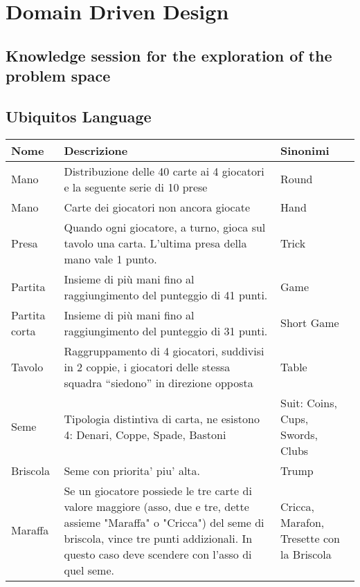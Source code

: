 \chapter{Domain Driven Design}
\label{ch:ddd} %

\section{Knowledge session for the exploration of the problem space}
\newpage
\section{Ubiquitos Language}
\begin{table}[!ht]
    \centering
    \begin{adjustbox}{max width=1.1\textwidth,center}
    \begin{tabular}{|l|p{10cm}|l|}
    \hline
        Nome & Descrizione & Sinonimi \\ \hline
        Mano & Distribuzione delle 40 carte ai 4 giocatori e la seguente serie di 10 prese & Round \\ \hline
        Mano & Carte dei giocatori non ancora giocate & Hand \\ \hline
        Presa & Quando ogni giocatore, a turno, gioca sul tavolo una carta. L’ultima presa della mano vale 1 punto. & Trick \\ \hline
        Partita & Insieme di più mani fino al raggiungimento del punteggio di 41 punti. & Game \\ \hline
        Partita corta & Insieme di più mani fino al raggiungimento del punteggio di 31 punti. & Short Game \\ \hline
        Tavolo & Raggruppamento di 4 giocatori, suddivisi in 2 coppie, i giocatori delle stessa squadra “siedono” in direzione opposta & Table \\ \hline
        Seme & Tipologia distintiva di carta, ne esistono 4: Denari, Coppe, Spade, Bastoni & Suit: Coins, Cups, Swords, Clubs~ \\ \hline
        Briscola & Seme con priorita’ piu’ alta. & Trump \\ \hline
        Maraffa & Se un giocatore possiede le tre carte di valore maggiore (asso, due e tre, dette assieme "Maraffa" o "Cricca")
        del seme di briscola, vince tre punti addizionali. In questo caso deve scendere con l'asso di quel seme. & Cricca, Marafon, Tresette con la Briscola \\ \hline

\end{tabular}
\end{adjustbox}
\end{table}
